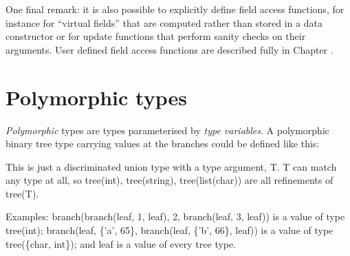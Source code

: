 \documentclass[a4paper,11pt,notitlepage,onecolumn]{book}
\begin{document}
One final remark: it is also possible to explicitly define field access
functions, for instance for ``virtual fields'' that are computed rather than
stored in a data constructor or for update functions that perform sanity
checks on their arguments.  User defined field access functions are
described fully in Chapter \XXX{}.



\section{Polymorphic types}

\emph{Polymorphic} types are types parameterised by
\emph{type variables}.  A polymorphic binary tree type carrying values at
the branches could be defined like this:
\begin{small}

\begin{ptabular}
\nextline
\end{ptabular}

\end{small}
This is just a discriminated union type with a type argument, \textsf{T}.  \textsf{T} can
match any type at all, so \textsf{tree(int)}, \textsf{tree(string)}, \textsf{tree(list(char))} are
all refinements of \textsf{tree(T)}.

Examples:
\textsf{branch(branch(leaf, 1, leaf), 2, branch(leaf, 3, leaf))}
is a value of type \textsf{tree(int)};
\textsf{branch(leaf, {\{}'a', 65{\}}, branch(leaf, {\{}'b', 66{\}}, leaf))}
is a value of type \textsf{tree({\{}char, int{\}})}; and
\textsf{leaf} is a value of every \textsf{tree} type.
\end{document}

